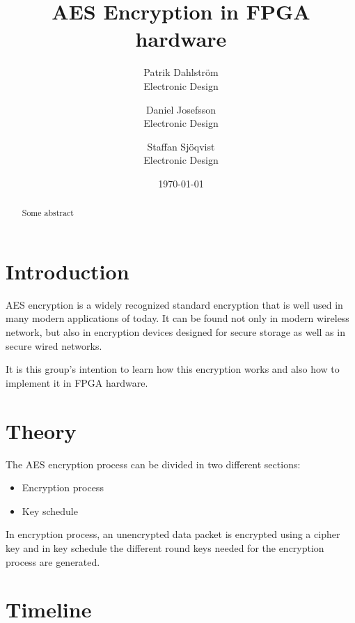 \documentclass[12pt]{article}
\title{AES Encryption in FPGA hardware}
\author{
        Patrik Dahlström \\
        Electronic Design\\
            \and
        Daniel Josefsson\\
        Electronic Design\\
            \and
        Staffan Sjöqvist\\
        Electronic Design
}
\date{\today}
\begin{document}
\maketitle

\begin{abstract}
Some abstract
\end{abstract}

\pagebreak

\section{Introduction}
AES encryption is a widely recognized standard encryption that is well used in many modern applications of today. It can be found not only in modern wireless network, but also in encryption devices designed for secure storage as well as in secure wired networks.

It is this group's intention to learn how this encryption works and also how to implement it in FPGA hardware.



\section{Theory} \label{sec:theory}
The AES encryption process can be divided in two different sections:
\begin{itemize}
\item Encryption process
\item Key schedule
\end{itemize}
In encryption process, an unencrypted data packet is encrypted using a cipher key and in key schedule the different round keys needed for the encryption process are generated.





\section{Timeline}\label{timeline}
\end{document}
